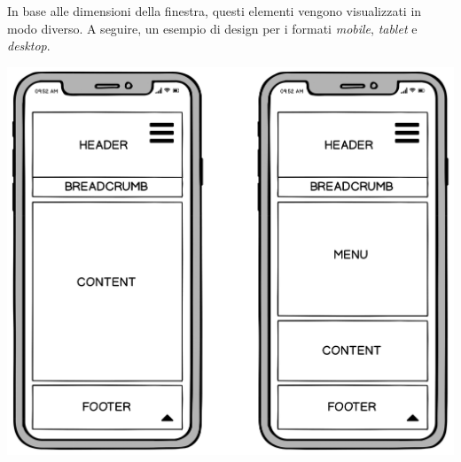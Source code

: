 In base alle dimensioni della finestra, questi elementi vengono visualizzati in modo diverso. A seguire, un esempio di design per i formati \textit{mobile}, \textit{tablet} e \textit{desktop}.

\begin{center}
	\includegraphics[scale=0.16]{img/Mobile}
\end{center}

